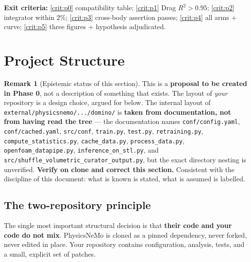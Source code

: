 \documentclass[10pt,a4paper]{article}
\theoremstyle{definition}
\newtheorem{remark}{Remark}[section]
\begin{document}
\textbf{Exit criteria:} \cref{crit:p0} compatibility table; \cref{crit:p1} Drag
$R^2 > 0.95$; \cref{crit:p2} integrator within $2\%$; \cref{crit:p3} cross-body
assertion passes; \cref{crit:p4} all arms + curve; \cref{crit:p5} three figures +
hypothesis adjudicated.

\appendix
\section{Project Structure}
\label{sec:structure}

\begin{remark}[Epistemic status of this section]
\label{rem:structstatus}
This is a \textbf{proposal to be created in Phase 0}, not a description of something
that exists. The layout of \emph{your} repository is a design choice, argued for below.
The internal layout of \texttt{external/physicsnemo/.../domino/} is
\textbf{taken from documentation, not from having read the tree} --- the documentation
names \texttt{conf/config.yaml}, \texttt{conf/cached.yaml}, \texttt{src/conf},
\texttt{train.py}, \texttt{test.py}, \texttt{retraining.py},
\texttt{compute\_statistics.py}, \texttt{cache\_data.py}, \texttt{process\_data.py},
\texttt{openfoam\_datapipe.py}, \texttt{inference\_on\_stl.py}, and
\texttt{src/shuffle\_volumetric\_curator\_output.py}, but the exact directory nesting
is unverified. \textbf{Verify on clone and correct this section.} Consistent with the
discipline of this document: what is known is stated, what is assumed is labelled.
\end{remark}

\subsection{The two-repository principle}

The single most important structural decision is that \textbf{their code and your code
do not mix}. PhysicsNeMo is cloned as a pinned dependency, never forked, never edited
in place. Your repository contains configuration, analysis, tests, and a small,
explicit set of patches.
\end{document}
